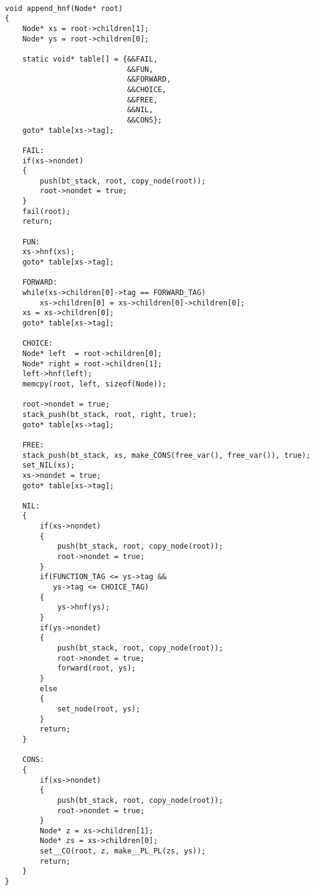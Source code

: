 \documentclass{article}
\begin{document}
\begin{verbatim}

void append_hnf(Node* root)
{
    Node* xs = root->children[1];
    Node* ys = root->children[0];

    static void* table[] = {&&FAIL, 
                            &&FUN, 
                            &&FORWARD, 
                            &&CHOICE, 
                            &&FREE, 
                            &&NIL, 
                            &&CONS};
    goto* table[xs->tag];

    FAIL:
    if(xs->nondet)
    {
        push(bt_stack, root, copy_node(root));
        root->nondet = true;
    }
    fail(root);
    return;

    FUN:
    xs->hnf(xs);
    goto* table[xs->tag];

    FORWARD:
    while(xs->children[0]->tag == FORWARD_TAG)
        xs->children[0] = xs->children[0]->children[0];
    xs = xs->children[0];
    goto* table[xs->tag];

    CHOICE:
    Node* left  = root->children[0];
    Node* right = root->children[1];
    left->hnf(left);
    memcpy(root, left, sizeof(Node));

    root->nondet = true;
    stack_push(bt_stack, root, right, true);
    goto* table[xs->tag];

    FREE:
    stack_push(bt_stack, xs, make_CONS(free_var(), free_var()), true);
    set_NIL(xs);
    xs->nondet = true;
    goto* table[xs->tag];

    NIL:
    {
        if(xs->nondet)
        {
            push(bt_stack, root, copy_node(root));
            root->nondet = true;
        }
        if(FUNCTION_TAG <= ys->tag &&
           ys->tag <= CHOICE_TAG)
        {
            ys->hnf(ys);
        }
        if(ys->nondet)
        {
            push(bt_stack, root, copy_node(root));
            root->nondet = true;
            forward(root, ys);
        }
        else
        {
            set_node(root, ys);
        }
        return;
    }

    CONS:
    {
        if(xs->nondet)
        {
            push(bt_stack, root, copy_node(root));
            root->nondet = true;
        }
        Node* z = xs->children[1];
        Node* zs = xs->children[0];
        set__CO(root, z, make__PL_PL(zs, ys));
        return;
    }
}
\end{verbatim}
\end{document}
